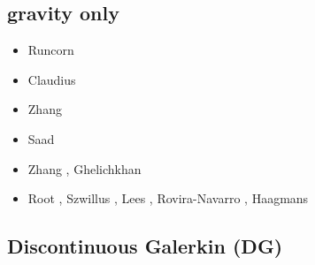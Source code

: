 \subsection{gravity only}

\begin{scriptsize}
\begin{itemize}
\item[\nineteensixtyfour] Runcorn \cite{runc64}\\
\item[\nineteeneightytwo] Claudius \cite{clau82}
\item[\twothousand] Zhang \etal \cite{zhmr00}
\item[\twothousandsix] Saad \cite{saad06}
\item[\twothousandeighteen] Zhang \etal \cite{zhmc18},
                           Ghelichkhan \etal \cite{ghmc18}
\item[\twothousandtwenty] Root \cite{root20}, Szwillus \etal \cite{szes20},
                          Lees \etal \cite{lerm20}, Rovira-Navarro \etal \cite{rovb20},
                          Haagmans \etal \cite{hasm20}
\end{itemize}
\end{scriptsize}

\subsection{Discontinuous Galerkin (DG)}


